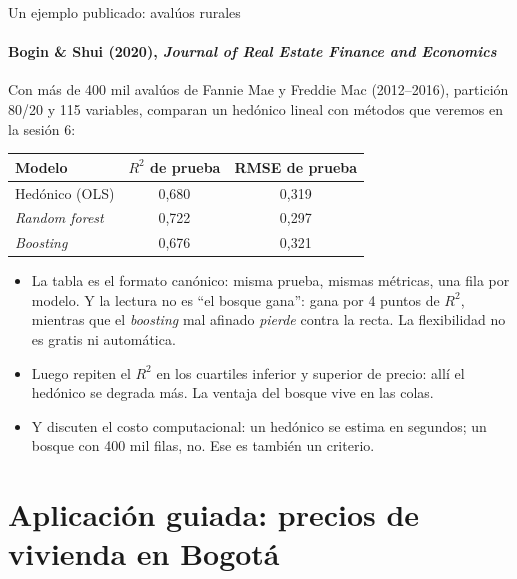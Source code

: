 \documentclass{beamer}
\newcommand{\1}{\mathbb{I}}
\begin{document}
\begin{frame}{Un ejemplo publicado: avalúos rurales}
\framesubtitle{Bogin \& Shui (2020), \emph{Journal of Real Estate Finance and Economics}}
\small
Con más de 400 mil avalúos de Fannie Mae y Freddie Mac (2012--2016), partición 80/20 y 115 variables, comparan un hedónico lineal con métodos que veremos en la sesión 6:
\vspace{0.1cm}
\begin{center}
\footnotesize
\begin{tabular}{lcc}
\hline
Modelo & $R^2$ de prueba & RMSE de prueba \\
\hline
Hedónico (OLS) & 0,680 & 0,319 \\
\emph{Random forest} & 0,722 & 0,297 \\
\emph{Boosting} & 0,676 & 0,321 \\
\hline
\end{tabular}
\end{center}
\pause
\vspace{0.15cm}
\begin{itemize}\itemsep4pt
  \item La tabla es el formato canónico: misma prueba, mismas métricas, una fila por modelo. Y la lectura no es ``el bosque gana'': gana por 4 puntos de $R^2$, mientras que el \emph{boosting} mal afinado \emph{pierde} contra la recta. La flexibilidad no es gratis ni automática. \pause
  \item Luego repiten el $R^2$ en los cuartiles inferior y superior de precio: allí el hedónico se degrada más. La ventaja del bosque vive en las colas.
  \item Y discuten el costo computacional: un hedónico se estima en segundos; un bosque con 400 mil filas, no. Ese es también un criterio.
\end{itemize}
\end{frame}


\section{Aplicación guiada: precios de vivienda en Bogotá}
\begin{frame}[noframenumbering]
\tableofcontents[currentsection]
\end{frame}
\end{document}
